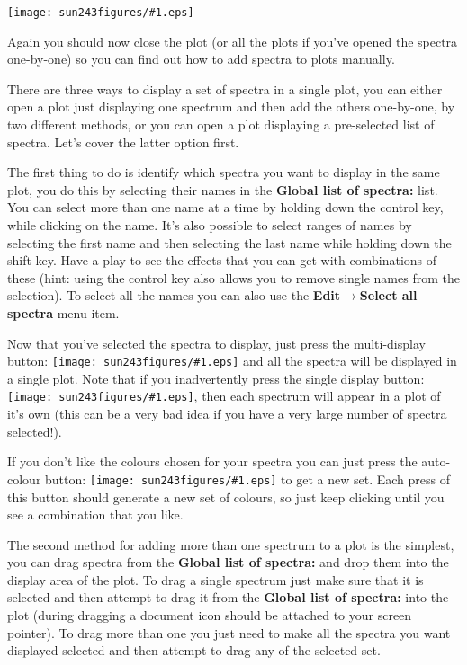 \documentclass[twoside,11pt]{article}
\newcommand{\htmladdimg}[1]{}
\newcommand{\latexhtml}[2]{#1}
\renewcommand{\_}{\texttt{\symbol{95}}}
\newcommand{\mainfigure}[1]
{\begin{center}
 \latexhtml{\texttt{[image: sun243\_figures/\#1.eps]}}{\htmladdimg{#1.gif}}
 \end{center}
}
\newcommand{\inline}[1]
        {\latexhtml{\texttt{[image: sun243\_figures/\#1.eps]}}
        {\htmladdimg[align=center]{#1.gif}}}
\newcommand{\submenuitem}[2]{\latexhtml{\textbf{#1$\rightarrow$#2}}{\textbf{#1->#2}}}
\newcommand{\labelitem}[1]{\textbf{#1}}
\begin{document}
\mainfigure{plot2}

Again you should now close the plot (or all the plots if you've opened
the spectra one-by-one) so you can find out how to add spectra to
plots manually.

There are three ways to display a set of spectra in a single plot, you
can either open a plot just displaying one spectrum and then add the
others one-by-one, by two different methods, or you can open a plot
displaying a pre-selected list of spectra. Let's cover the latter
option first.

\label{selecting_spectra}
The first thing to do is identify which spectra you want to display in
the same plot, you do this by selecting their names in the
\labelitem{Global list of spectra:} list. You can select more than one
name at a time by holding down the control key, while clicking on the
name. It's also possible to select ranges of names by selecting the
first name and then selecting the last name while holding down the
shift key. Have a play to see the effects that you can get with
combinations of these (hint: using the control key also allows you to
remove single names from the selection). To select all the names you
can also use the \submenuitem{Edit}{Select all spectra} menu item.

Now that you've selected the spectra to display, just press the
multi-display button: \inline{multidisplay} and all the spectra
will be displayed in a single plot. Note that if you inadvertently
press the single display button: \inline{display}, then each
spectrum will appear in a plot of it's own (this can be a very bad
idea if you have a very large number of spectra selected!).

If you don't like the colours chosen for your spectra you can just press the
auto-colour button: \inline{rainbow} to get a new set. Each press of this
button should generate a new set of colours, so just keep clicking until you
see a combination that you like.

The second method for adding more than one spectrum to a plot is the
simplest, you can drag spectra from the \labelitem{Global list of
spectra:} and drop them into the display area of the plot. To drag a
single spectrum just make sure that it is selected and then attempt to
drag it from the \labelitem{Global list of spectra:} into the plot
(during dragging a document icon should be attached to your screen
pointer). To drag more than one you just need to make all the spectra
you want displayed selected and then attempt to drag any of the
selected set.
\end{document}
